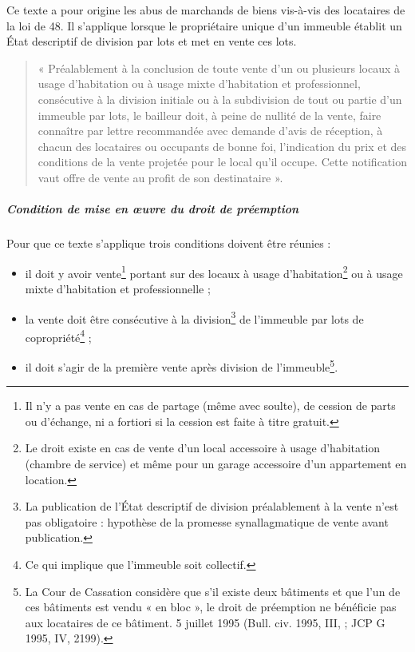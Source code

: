 				Ce texte a pour origine les abus de marchands de biens vis-à-vis des locataires de la loi de 48. Il s’applique
				lorsque le propriétaire unique d’un immeuble établit un État descriptif de division par lots et met en vente
				ces lots.
				
				\begin{quote}
					« Préalablement à la conclusion de toute vente d'un ou plusieurs locaux à usage d'habitation ou à usage
					mixte d'habitation et professionnel, consécutive à la division initiale ou à la subdivision de tout ou partie d'un immeuble par lots, le bailleur doit, à peine de nullité de la vente, faire connaître par lettre
					recommandée avec demande d'avis de réception, à chacun des locataires ou occupants de bonne foi, l'indication du prix et des conditions de la vente projetée pour le local qu'il occupe. Cette notification vaut offre de vente au profit de son destinataire ».
				\end{quote}
				
				\subparagraph{Condition de mise en œuvre du droit de préemption}
				
				Pour que ce texte s’applique trois conditions doivent être réunies :
				\begin{itemize}
					\item il doit y avoir vente\footnote{Il n’y a pas vente en cas de partage (même avec soulte), de cession de parts ou d’échange, ni a fortiori si la cession est faite à titre gratuit.} portant sur des locaux à usage d'habitation\footnote{Le droit existe en cas de vente d’un local accessoire à usage d’habitation (chambre de service) et même pour un garage accessoire d’un appartement en location.} ou à usage mixte d'habitation et professionnelle ;
					\item la vente doit être consécutive à la division\footnote{La publication de l'État descriptif de division préalablement à la vente n’est pas obligatoire : hypothèse de la promesse synallagmatique de vente avant publication.} de l’immeuble par lots de copropriété\footnote{Ce qui implique que l’immeuble soit collectif.} ;
					\item il doit s’agir de la première vente après division de l’immeuble\footnote{La Cour de Cassation considère que s’il existe deux bâtiments et que l’un de ces bâtiments est vendu « en bloc », le droit de préemption ne bénéficie pas aux locataires de ce bâtiment. 5 juillet 1995 (Bull. civ. 1995, III,  ; JCP G 1995, IV, 2199).}.
				\end{itemize}
				
